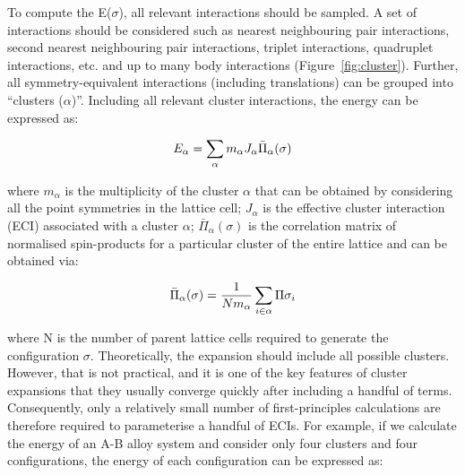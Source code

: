 \documentclass[../main.tex]{subfiles}
\begin{document}
To compute the E($\sigma$), all relevant interactions should be sampled. A set of interactions should be considered such as nearest neighbouring pair interactions, second nearest neighbouring pair interactions, triplet interactions, quadruplet interactions, etc. and up to many body interactions (Figure~\ref{fig:cluster}). Further, all symmetry-equivalent interactions (including translations) can be grouped into ``clusters ($\alpha$)''. Including all relevant cluster interactions, the energy can be expressed as:

\begin{equation}
    \centering
    {E}_{\alpha}=\sum_\alpha {m_\alpha}{J_\alpha}{\bar{\Pi}_\alpha(\sigma)}
    \label{eq:clusters}
\end{equation} 

where $m_\alpha$ is the multiplicity of the cluster $\alpha$ that can be obtained by considering all the point symmetries in the lattice cell; $J_\alpha$ is the effective cluster interaction (ECI) associated with a cluster $\alpha$; $\bar{\Pi}_\alpha(\sigma)$ is the correlation matrix of normalised spin-products for a particular cluster of the entire lattice and can be obtained via:

\begin{equation}
    \centering
    {\bar{\Pi}_\alpha(\sigma)}=\frac{1}{N{m_\alpha}}\sum_{i\in\alpha} {\Pi{\sigma_i}}
    \label{eq:correlation_matrix}
\end{equation} 

where N is the number of parent lattice cells required to generate the configuration $\sigma$. Theoretically, the expansion should include all possible clusters. However, that is not practical, and it is one of the key features of cluster expansions that they usually converge quickly after including a handful of terms.\cite{van2001first} Consequently, only a relatively small number of first-principles calculations are therefore required to parameterise a handful of ECIs. For example, if we calculate the energy of an A-B alloy system and consider only four clusters and four configurations, the energy of each configuration can be expressed as:
\end{document}
